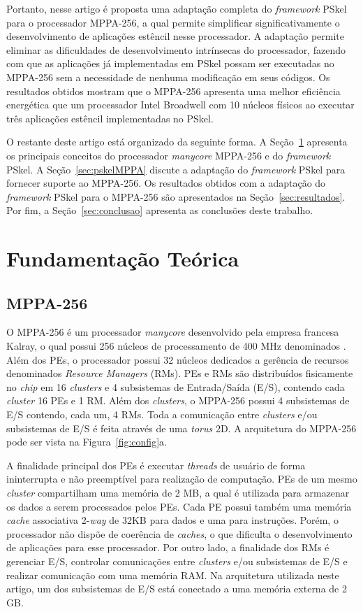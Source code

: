 \documentclass[12pt]{article}
\newcommand{\fw}{\textit{framework}\xspace}
\newcommand{\pskel}{PSkel\xspace}
\newcommand{\mppa}{MPPA-256\xspace}
\begin{document}
Portanto, nesse artigo é proposta uma adaptação completa do \fw \pskel para o
processador \mppa, a qual permite simplificar significativamente o
desenvolvimento de aplicações estêncil nesse processador. A adaptação permite
eliminar as dificuldades de desenvolvimento intrínsecas do processador, fazendo
com que as aplicações já implementadas em \pskel possam ser executadas no \mppa
sem a necessidade de nenhuma modificação em seus códigos. Os resultados obtidos
mostram que o \mppa apresenta uma melhor eficiência energética que um
processador Intel Broadwell com 10 núcleos físicos ao executar três aplicações
estêncil implementadas no \pskel.

O restante deste artigo está organizado da seguinte forma. A
Seção~\ref{sec:fundamentacao} apresenta os principais conceitos do processador
\textit{manycore} \mppa e do \fw \pskel. A Seção~\ref{sec:pskelMPPA} discute a
adaptação do \fw \pskel para fornecer suporte ao \mppa. Os resultados obtidos
com a adaptação do \fw \pskel para o \mppa são apresentados na
Seção~\ref{sec:resultados}. Por fim, a Seção~\ref{sec:conclusao} apresenta as
conclusões deste trabalho.

\section{Fundamentação Teórica}
\label{sec:fundamentacao}

\subsection{MPPA-256}
\label{subsec:mppa}

O \mppa é um processador \textit{manycore} desenvolvido pela empresa francesa
Kalray, o qual possui 256 núcleos de processamento de 400 MHz denominados \pes.
Além dos PEs, o processador possui 32 núcleos dedicados a gerência de recursos
denominados \textit{Resource Managers} (RMs). PEs e RMs são distribuídos
fisicamente no \textit{chip} em 16 \textit{clusters} e 4 subsistemas de
Entrada/Saída (E/S), contendo cada \textit{cluster} 16 PEs e 1 RM. Além dos
\textit{clusters}, o \mppa possui 4 subsistemas de E/S contendo, cada um, 4 RMs.
Toda a comunicação entre \textit{clusters} e/ou subsistemas de E/S é feita
através de uma \noc \textit{torus} 2D. A arquitetura do \mppa pode ser vista na
Figura~\ref{fig:config}a.

A finalidade principal dos PEs é executar \textit{threads} de usuário de forma
ininterrupta e não preemptível para realização de computação. PEs de um mesmo
\textit{cluster} compartilham uma memória de 2 MB, a qual é utilizada para
armazenar os dados a serem processados pelos PEs. Cada PE possui também uma
memória \textit{cache} associativa 2-\textit{way} de 32KB para dados e uma para
instruções. Porém, o processador não dispõe de coerência de \textit{caches}, o
que dificulta o desenvolvimento de aplicações para esse processador. Por outro
lado, a finalidade dos RMs é gerenciar E/S, controlar comunicações entre
\textit{clusters} e/ou subsistemas de E/S e realizar comunicação com uma memória
RAM. Na arquitetura utilizada neste artigo, um dos subsistemas de E/S está
conectado a uma memória externa \lpddr de 2 GB.
\end{document}
